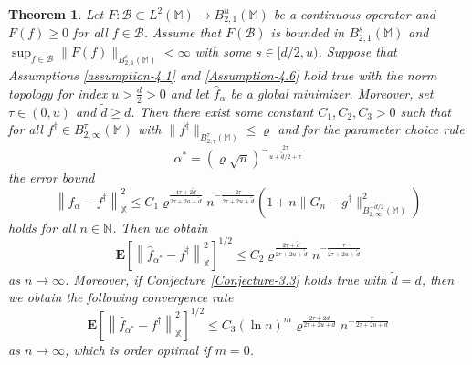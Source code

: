 \documentclass[10pt]{iopart}
\newtheorem{theorem}{Theorem}[section]
\begin{document}
\begin{theorem}\label{Theorem-4.10}
Let $F: \mathcal{B}\subset L^{2}(\mathbb{M})\rightarrow B_{2,1}^{u}(\mathbb{M})$ be a continuous operator and $F(f)\geq 0$ for all $f\in\mathcal{B}$.
Assume that $F(\mathcal{B})$ is bounded in $B_{2,1}^{s}(\mathbb{M})$ and $\sup_{f\in \mathcal{B}}\|F(f)\|_{B_{2,1}^{s}(\mathbb{M})}<\infty$ with
some $s\in[d/2, u)$. Suppose that Assumptions \ref{assumption-4.1} and \ref{Assumption-4.6} hold true with the norm topology for index 
$u>\frac{d}{2}>0$ and let $\widehat{f}_{\alpha}$ be a global minimizer. Moreover, set $\tau\in (0, u)$ and $\tilde{d}\geq d$. Then there exist  
some constant $C_{1}, C_{2}, C_{3}>0$ such that for all $f^{\dagger}\in B_{2, \infty}^{\tau}(\mathbb{M})$ with $\|f^{\dagger}\|_{B_{2, \tau}
^{\tau}(\mathbb{M})}\leq \varrho$ and for the parameter choice rule
\begin{equation*}
\alpha^{*}=(\varrho \sqrt{n})^{-\frac{2\tau}{u+\tilde{d}/2+\tau}}
\end{equation*}
the error bound 
\begin{equation}\label{54}
\left\|\widehat{f}_{\alpha}-f^{\dagger}\right\|_{\mathbb{X}}^{2}\leq 
C_{1}\varrho^{\frac{4\tau+2\tilde{d}}{2\tau+2a+\tilde{d}}}n^{-\frac{2\tau}{2\tau+2u+\tilde{d}}}\left(1+n\|G_{n}-
g^{\dagger}\|_{B_{2, \infty}^{-\tilde{d}/2}(\mathbb{M})}^{2}\right)
\end{equation}
holds for all $n\in\mathbb{N}$. Then we obtain
\begin{equation}\label{55}
\mathbf{E}\left[\left\|\widehat{f}_{\alpha^{*}}-f^{\dagger}\right\|_{\mathbb{X}}^{2}\right]^{1/2}\leq C_{2}\varrho^{\frac{2\tau+\tilde{d}}
{2\tau+2u+\tilde{d}}}n^{-\frac{\tau}{2\tau+2u+\tilde{d}}}
\end{equation}
as $n\rightarrow\infty$. Moreover, if Conjecture \ref{Conjecture-3.3} holds true with $\tilde{d}=d$,
then we obtain the following convergence rate
\begin{equation}\label{56}
\mathbf{E}\left[\left\|\widehat{f}_{\alpha^{*}}-f^{\dagger}\right\|_{\mathbb{X}}^{2}\right]^{1/2}\leq C_{3}(\ln n)^{m}\varrho^{\frac{2\tau+2d}
{2\tau+2u+d}}n^{-\frac{\tau}{2\tau+2u+d}}
\end{equation}
 as $n\rightarrow\infty$, which is order optimal if $m=0$. 
\end{theorem}
\end{document}
